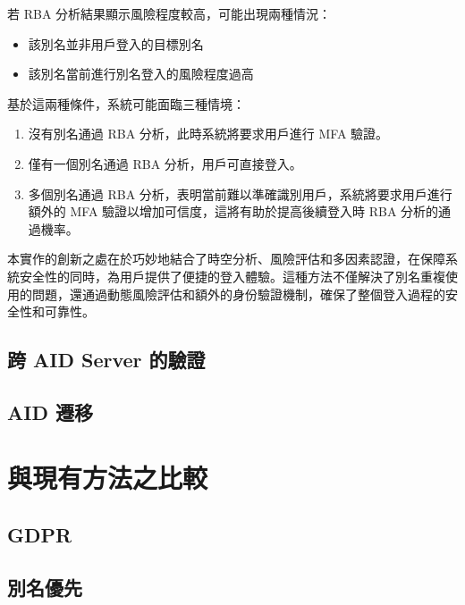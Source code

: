 若 RBA 分析結果顯示風險程度較高，可能出現兩種情況：
\begin{itemize}
  \item 該別名並非用戶登入的目標別名
  \item 該別名當前進行別名登入的風險程度過高
\end{itemize}

基於這兩種條件，系統可能面臨三種情境：
\begin{enumerate}
  \item 沒有別名通過 RBA 分析，此時系統將要求用戶進行 MFA 驗證。
  \item 僅有一個別名通過 RBA 分析，用戶可直接登入。
  \item 多個別名通過 RBA 分析，表明當前難以準確識別用戶，系統將要求用戶進行額外的 MFA 驗證以增加可信度，這將有助於提高後續登入時 RBA 分析的通過機率。
\end{enumerate}

本實作的創新之處在於巧妙地結合了時空分析、風險評估和多因素認證，在保障系統安全性的同時，為用戶提供了便捷的登入體驗。這種方法不僅解決了別名重複使用的問題，還通過動態風險評估和額外的身份驗證機制，確保了整個登入過程的安全性和可靠性。

\subsection{跨 AID Server 的驗證}
\subsection{AID 遷移}

\section{與現有方法之比較}
\subsection{GDPR}
\subsection{別名優先}
